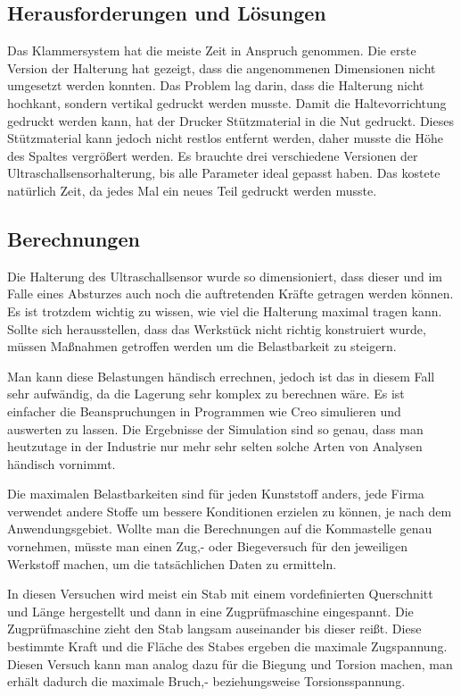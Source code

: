 	\subsection{Herausforderungen und Lösungen}

	Das Klammersystem hat die meiste Zeit in Anspruch genommen.
	Die erste Version der Halterung hat gezeigt, dass die angenommenen Dimensionen nicht umgesetzt werden konnten.
	Das Problem lag darin, dass die Halterung nicht hochkant, sondern vertikal gedruckt werden musste.
	Damit die Haltevorrichtung gedruckt werden kann, hat der Drucker Stützmaterial in die Nut gedruckt.
	Dieses Stützmaterial kann jedoch nicht restlos entfernt werden, daher musste die Höhe des Spaltes vergrößert werden.
	Es brauchte drei verschiedene Versionen der Ultraschallsensorhalterung, bis alle Parameter ideal gepasst haben. Das kostete natürlich Zeit, da jedes Mal ein neues Teil gedruckt werden musste.

			\newpage

	\subsection{Berechnungen}

	Die Halterung des Ultraschallsensor wurde so dimensioniert, dass dieser und im Falle eines Absturzes auch noch die auftretenden Kräfte getragen werden können.
	Es ist trotzdem wichtig zu wissen, wie viel die Halterung maximal tragen kann.
	Sollte sich herausstellen, dass das Werkstück nicht richtig konstruiert wurde, müssen Maßnahmen getroffen werden um die Belastbarkeit zu steigern.

	Man kann diese Belastungen händisch errechnen, jedoch ist das in diesem Fall sehr aufwändig, da die Lagerung sehr komplex zu berechnen wäre.
	Es ist einfacher die Beanspruchungen in Programmen wie Creo simulieren und auswerten zu lassen.
	Die Ergebnisse der Simulation sind so genau, dass man heutzutage in der Industrie nur mehr sehr selten solche Arten von Analysen händisch vornimmt.

	Die maximalen Belastbarkeiten sind für jeden Kunststoff anders, jede Firma verwendet andere Stoffe um bessere Konditionen erzielen zu können, je nach dem Anwendungsgebiet.
	Wollte man die Berechnungen auf die Kommastelle genau vornehmen, müsste man einen Zug,- oder Biegeversuch für den jeweiligen Werkstoff machen,
	um die tatsächlichen Daten zu ermitteln.

	In diesen Versuchen wird meist ein Stab mit einem vordefinierten Querschnitt und Länge hergestellt und dann in eine Zugprüfmaschine eingespannt.
	Die Zugprüfmaschine zieht den Stab langsam auseinander bis dieser reißt. Diese bestimmte Kraft und die Fläche des Stabes ergeben die maximale Zugspannung.
	Diesen Versuch kann man analog dazu für die Biegung und Torsion machen, man erhält dadurch die maximale Bruch,- beziehungsweise Torsionsspannung.

